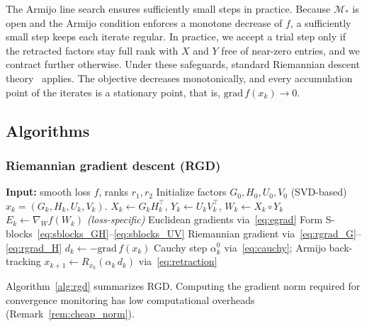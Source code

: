 \documentclass[letterpaper, 10 pt, conference]{ieeeconf}
\newcommand{\cM}{\mathcal{M}}
\newcommand{\Had}{\circ}
\theoremstyle{plain}
\theoremstyle{definition}
\theoremstyle{remark}
\begin{document}
The Armijo line search ensures sufficiently small steps in practice. Because $\cM_*$ is open and the Armijo condition enforces a monotone decrease of $f$, a sufficiently small step keeps each iterate regular. In practice, we accept a trial step only if the retracted factors stay full rank with $X$ and $Y$ free of near-zero entries, and we contract further otherwise. Under these safeguards, standard Riemannian descent theory~\cite{absilbook,boumal2023introduction} applies. The objective decreases monotonically, and every accumulation point of the iterates is a stationary point, that is, $\mathrm{grad}\,f(x_k)\to 0$.

\subsection{Algorithms}

\subsubsection{Riemannian gradient descent (RGD)}

\begin{algorithm}[t]
\caption{RGD on the Hadamard low-rank manifold}
\label{alg:rgd}
\begin{algorithmic}[1]
\STATE \textbf{Input:} smooth loss $f$, ranks $r_1,r_2$
\STATE Initialize factors $G_0,H_0,U_0,V_0$ (SVD-based)
    \STATE $x_k=(G_k,H_k,U_k,V_k)$.
  \STATE $X_k \leftarrow G_kH _k^\top$,\; $Y_k \leftarrow U_kV_k^\top$,\; $W_k \leftarrow X_k\Had Y_k$
  \STATE $E_k \leftarrow \nabla_W f(W_k)$ \hfill\textit{(loss-specific)}
  \STATE Euclidean gradients via~\eqref{eq:egrad}
  \STATE Form S-blocks~\eqref{eq:sblocks_GH}--\eqref{eq:sblocks_UV}
  \STATE Riemannian gradient via~\eqref{eq:rgrad_G}--\eqref{eq:rgrad_H}
  \STATE $d_k \leftarrow -\mathrm{grad}\,f(x_k)$
  \STATE Cauchy step $\alpha_k^0$ via~\eqref{eq:cauchy}; Armijo back-tracking
  \STATE $x_{k+1} \leftarrow R_{x_k}(\alpha_k\,d_k)$ via~\eqref{eq:retraction}
\ENDFOR
\end{algorithmic}
\end{algorithm}

Algorithm~\ref{alg:rgd} summarizes RGD. Computing the gradient norm required for convergence monitoring has low computational overheads (Remark~\ref{rem:cheap_norm}).
\end{document}
